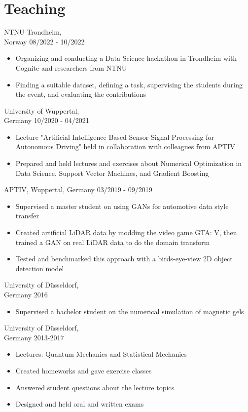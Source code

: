 \documentclass[singlesided,
               paper=a4,
               fontsize=10pt
              ]{my-resume}
\begin{document}
\section[\faBook]{Teaching}
	{NTNU Trondheim,\\ Norway}
	{08/2022 - 10/2022}
	{\begin{itemize}
		\item Organizing and conducting a Data Science hackathon in Trondheim with Cognite and researchers from NTNU
		\item Finding a suitable dataset, defining a task, supervising the students during the event, and evaluating the contributions
	\end{itemize}}

    {University of Wuppertal,\\ Germany}
    {10/2020 - 04/2021}
    {\begin{itemize}[leftmargin=2em]
        \item Lecture "Artificial Intelligence Based Sensor Signal Processing for Autonomous Driving" held in collaboration with colleagues from APTIV
        \item Prepared and held lectures and exercises about Numerical Optimization in Data Science, Support Vector Machines, and Gradient Boosting
    \end{itemize}}
%
    {APTIV, Wuppertal, Germany}
    {03/2019 - 09/2019}
    {\begin{itemize}[leftmargin=2em]
        \item Supervised a master student on using GANs for automotive data style transfer
        \item Created artificial LiDAR data by modding the video game GTA: V, then trained a GAN on real LiDAR data to do the domain transform
        \item Tested and benchmarked this approach with a birds-eye-view 2D object detection model
    \end{itemize}}
%
    {University of Düsseldorf, \\ Germany}
    {2016}
    {\begin{itemize}[leftmargin=2em]
        \item Supervised a bachelor student on the numerical simulation of magnetic gels 
    \end{itemize}}
%
    {University of Düsseldorf, \\ Germany}
    {2013-2017}
    {\begin{itemize}[leftmargin=2em]
        \item Lectures: Quantum Mechanics and Statistical Mechanics
        \item Created homeworks and gave exercise classes
        \item Answered student questions about the lecture topics
        \item Designed and held oral and written exams
    \end{itemize}}
\end{document}
